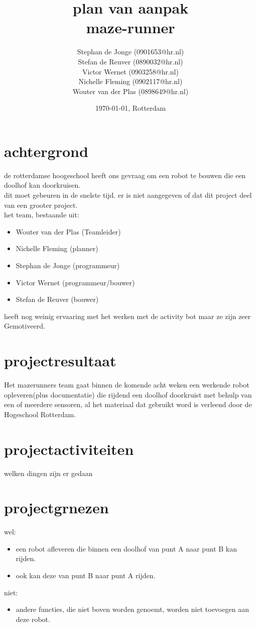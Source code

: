 \documentclass[oneside]{book}
\title{plan van aanpak\\maze-runner}
\author{
	Stephan de Jonge (0901653@hr.nl)\\
	Stefan de Reuver (0890032@hr.nl)\\
	Victor Wernet (0903258@hr.nl)\\
	Nichelle Fleming (0902117@hr.nl)\\
	Wouter van der Plas (0898649@hr.nl)
}
\date{\today, Rotterdam}
\begin{document}
\maketitle
\tableofcontents


\chapter{achtergrond}

de rotterdamse hoogeschool heeft ons gevraag om een robot te bouwen die een doolhof kan doorkruisen.\\
dit moet gebeuren in de snelste tijd. er is niet aangegeven of dat dit project deel van een grooter project.\\
het team, bestaande uit:\\
\begin{itemize}
	\item Wouter van der Plas (Teamleider)
	\item Nichelle Fleming (planner)
	\item Stephan de Jonge (programmeur)
	\item Victor Wernet (programmeur/bouwer)
	\item Stefan de Reuver (bouwer)
\end{itemize}	
heeft nog weinig ervaaring met het werken met de activity bot maar ze zijn zeer Gemotiveerd.\\

\clearpage
\chapter{projectresultaat}
Het mazerunners team gaat binnen de komende acht weken een werkende robot opleveren(plus documentatie) die rijdend een doolhof doorkruist met behulp van een of meerdere sensoren, al het materiaal dat gebruikt word is verleend door de Hogeschool Rotterdam.
\clearpage
\chapter{projectactiviteiten}
welken dingen zijn er gedaan
\clearpage
\chapter{projectgrnezen}
wel:\\
\begin{itemize}
	\item een robot afleveren die binnen een doolhof van punt A naar punt 
	B kan rijden.
	\item ook kan deze van punt B naar punt A rijden.
\end{itemize}
niet:\\
\begin{itemize}
	\item andere functies, die niet boven worden genoemt, worden niet toevoegen aan deze robot.
\end{itemize}
\clearpage
\end{document}
